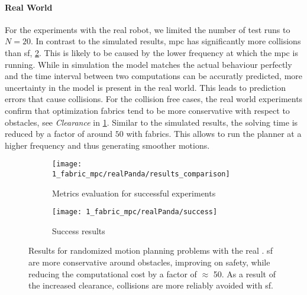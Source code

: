 \paragraph{Real World}
For the experiments with the real robot, we limited the number of test runs to $N=20$. In
contrast to the simulated results, \ac{mpc} has significantly more collisions than
\ac{sf}, \cref{subfig:experiment1_realPanda_success}.  This is likely to be caused by the
lower frequency at which the \ac{mpc} is running. While in simulation the model matches
the actual behaviour perfectly and the time interval between two computations can be
accuratly predicted, more uncertainty in the model is present in the real world. This
leads to prediction errors that cause collisions.  For the collision free cases, the real
world experiments confirm that optimization fabrics tend to be more conservative with
respect to obstacles, see \textit{Clearance} in \cref{subfig:experiment1_realPanda_res}.
Similar to the simulated results, the solving time is reduced by a factor of around $50$
with fabrics. This
allows to run the planner at a higher frequency and thus generating smoother motions.

\begin{figure}[ht]
  \centering
  \begin{subfigure}{\linewidth}
    \centering
    \texttt{[image: 1\_fabric\_mpc/realPanda/results\_comparison]}
    \caption{Metrics evaluation for successful experiments}%
    \label{subfig:experiment1_realPanda_res}
  \end{subfigure}
  \begin{subfigure}{\linewidth}
    \centering
    \texttt{[image: 1\_fabric\_mpc/realPanda/success]}
    \caption{Success results}%
    \label{subfig:experiment1_realPanda_success}
  \end{subfigure}
  \caption{Results for randomized motion planning problems with the real \panda{}.
    \ac{sf} are more conservative around obstacles, improving on safety, while
    reducing the computational cost by a factor of $\approx$ 50.
    As a result of the increased clearance, collisions are more reliably avoided with
    \ac{sf}.
  }%
  \label{fig:experiment1_realPanda}
\end{figure}


